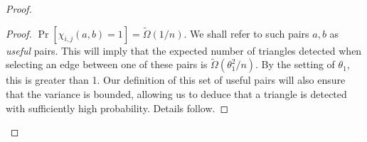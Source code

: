 \begin{proof}
\begin{proof}
 $\Pr[\chi_{i,j}(a,b)=1] = \tilde{\Omega}(1/n)$. We shall refer to such pairs $a,b$  as \emph{useful} pairs. %
This will imply  that the expected number of triangles detected when selecting an edge between one of these pairs is $\tilde{\Omega}(\theta_1^2/n)$. %
By the setting of $\theta_1$, this is greater than 1. %
Our definition of  this set of useful pairs  will also ensure that the variance is bounded, allowing us to deduce that a triangle is detected with sufficiently high probability. Details follow.



\end{proof}
\end{proof}
